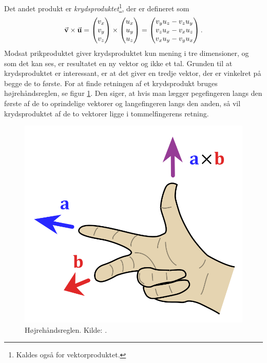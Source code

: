 Det andet produkt er {\em krydsproduktet}\footnote{Kaldes også for vektorproduktet.},
der er defineret som
\begin{equation} \label{eq:krydsprodukt}
\va{v}\times \va{u}=
    \begin{pmatrix}
    v_x\\v_y\\v_z
    \end{pmatrix}
    \times\begin{pmatrix}
    u_x\\u_y\\u_z
    \end{pmatrix}
    =\begin{pmatrix}
    v_yu_z-v_zu_y\\v_zu_x-v_xu_z\\v_xu_y-v_yu_x
    \end{pmatrix}.
\end{equation}
Modsat prikproduktet giver krydsproduktet kun mening i tre dimensioner, og som det kan ses, er resultatet en ny vektor og ikke et tal.
Grunden til at krydsproduktet er interessant, er at det giver en tredje vektor, der er vinkelret på begge de to første. For at finde retningen af et krydsprodukt bruges højrehåndsreglen, se figur \ref{fig:right_hand_rule_mat}. Den siger, at hvis man lægger pegefingeren langs den første af de to oprindelige vektorer og langefingeren langs den anden, så vil krydsproduktet af de to vektorer ligge i tommelfingerens retning.
\begin{figure}[h!]
    \centering
    \includegraphics[width = 0.5 \textwidth]{Mat/matfig/righthandmat.png}
    \caption{Højrehåndsreglen. Kilde: \cite{RighthandRuleWikipedia}.}
    \label{fig:right_hand_rule_mat}
\end{figure}

